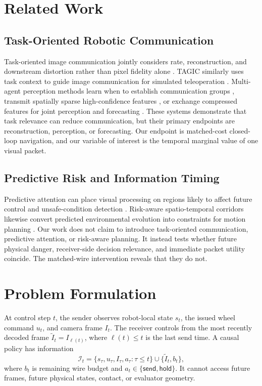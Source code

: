 \documentclass[letterpaper,10pt,conference]{ieeeconf}
\newcommand{\send}{\mathsf{send}}
\newcommand{\hold}{\mathsf{hold}}
\begin{document}
\section{Related Work}

\subsection{Task-Oriented Robotic Communication}
Task-oriented image communication jointly considers rate, reconstruction, and
downstream distortion rather than pixel fidelity alone \cite{liu2022task}.
TAGIC similarly uses task context to guide image communication for simulated
teleoperation \cite{diao2024tagic}. Multi-agent perception methods learn when
to establish communication groups \cite{liu2020when2com}, transmit spatially
sparse high-confidence features \cite{hu2022where2comm}, or exchange compressed
features for joint perception and forecasting \cite{wang2020v2vnet}. These
systems demonstrate that task relevance can reduce communication, but their
primary endpoints are reconstruction, perception, or forecasting. Our endpoint
is matched-cost closed-loop navigation, and our variable of interest is the
temporal marginal value of one visual packet.

\subsection{Predictive Risk and Information Timing}
Predictive attention can place visual processing on regions likely to affect
future control and unsafe-condition detection \cite{lee2020perceptual}.
Risk-aware spatio-temporal corridors likewise convert predicted environmental
evolution into constraints for motion planning \cite{chen2023rast}. Our work
does not claim to introduce task-oriented communication, predictive attention,
or risk-aware planning. It instead tests whether future physical danger,
receiver-side decision relevance, and immediate packet utility coincide. The
matched-wire intervention reveals that they do not.

\section{Problem Formulation}

At control step $t$, the sender observes robot-local state $s_t$, the issued
wheel command $u_t$, and camera frame $I_t$. The receiver controls from the most
recently decoded frame $\tilde I_t=I_{\ell(t)}$, where $\ell(t)\leq t$ is the
last send time. A causal policy has information
\begin{equation}
\mathcal I_t=\{s_\tau,u_\tau,I_\tau,a_\tau:\tau\leq t\}
\cup\{\tilde I_t,b_t\},
\end{equation}
where $b_t$ is remaining wire budget and
$a_t\in\{\send,\hold\}$. It cannot access future frames, future physical
states, contact, or evaluator geometry.
\end{document}
